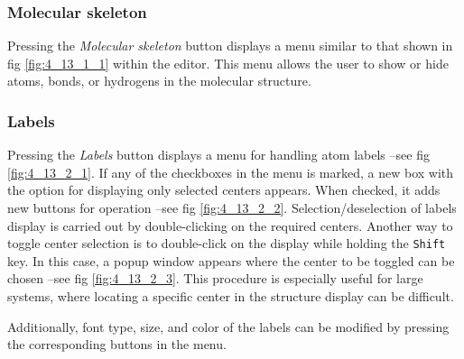 \documentclass[10pt]{article}
\begin{document}
\subsubsection{Molecular skeleton \label{sec:4.13.1}}

Pressing the {\it Molecular skeleton} button displays a menu similar to that shown in fig \ref{fig:4_13_1_1}  
within the editor. This menu allows the user to show or hide atoms, bonds, or hydrogens in the molecular structure.


\subsubsection{Labels \label{sec:4.13.2}}

Pressing the {\it Labels} button displays a menu for handling atom labels --see fig 
\ref{fig:4_13_2_1}. If any of the checkboxes in the menu is marked, a new box with the option
for displaying only selected centers appears. When checked, it adds new buttons for operation
--see fig \ref{fig:4_13_2_2}. Selection/deselection of labels display is carried out by double-clicking
on the required centers. Another way to toggle center selection is to double-click on the display while holding the \texttt{Shift} key. In this case, a popup window appears where
the center to be toggled can be chosen --see fig \ref{fig:4_13_2_3}. This procedure is
especially useful for large systems, where locating a specific center in the structure display
can be difficult.

Additionally, font type, size, and color of the labels can be modified by pressing the 
corresponding buttons in the menu.
\end{document}
